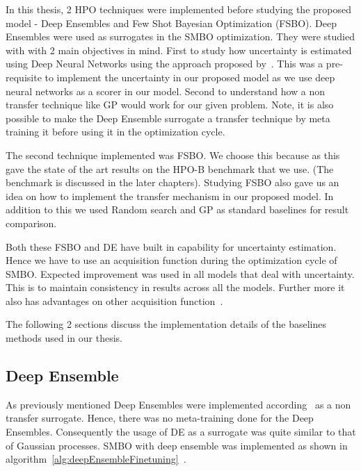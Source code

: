 \documentclass[12pt, twoside, ngerman]{report}
\begin{document}
In this thesis,  2 HPO techniques were implemented before studying the proposed model - Deep Ensembles and Few Shot Bayesian Optimization (FSBO).
Deep Ensembles were used as surrogates in the SMBO optimization.
They were studied with with 2 main objectives in mind.
First to study how uncertainty is estimated using Deep Neural Networks using the approach proposed by~\cite{DeepEnsemblePaper}.
This was a pre-requisite to implement the uncertainty in our proposed model as we use deep neural networks as a scorer in our model. 
Second to understand how a non transfer technique like GP would work for our given problem.
Note,  it is also possible to make the Deep Ensemble surrogate a transfer technique by meta training it before using it in the optimization cycle.

The second technique implemented was FSBO.
We choose this because as this gave the state of the art results on the HPO-B benchmark that we use.
(The benchmark is discussed in the later chapters).
Studying FSBO also gave us an idea on how to implement the transfer mechanism in our proposed model.
In addition to this we used Random search and GP as standard baselines for result comparison.

Both these FSBO and DE have built in capability for uncertainty estimation.
Hence we have to use an acquisition function during the optimization cycle of SMBO.
Expected improvement was used in all models that deal with uncertainty.
This is to maintain consistency in results across all the models.
Further more it also has advantages on other acquisition function~\cite{Jones1998}.


The following 2 sections discuss the implementation details of the baselines methods used in our thesis.

\subsection{Deep Ensemble}

As previously mentioned Deep Ensembles were implemented according~\cite{DeepEnsemblePaper} as a non transfer surrogate.
Hence,  there was no meta-training done for the Deep Ensembles.
Consequently the usage of DE as a surrogate was quite similar to that of Gaussian processes.
SMBO with deep ensemble was implemented as shown in algorithm~\ref{alg:deepEnsembleFinetuning}~\cite{pineda2021hpob}.
\end{document}
